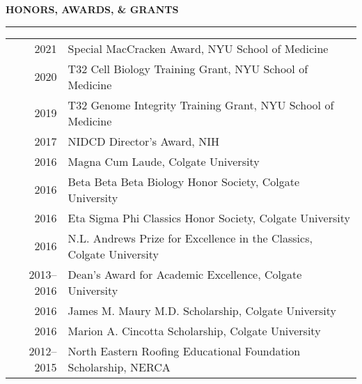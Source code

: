 \documentclass[10pt, letterpaper]{article} %
\newenvironment{CVSection}{
\begin{addmargin}[2em]{0em}
\begin{samepage}}
{\end{samepage}
\end{addmargin}\bigskip}
\newcommand{\CVHeading}[1]{
\MakeUppercase{\bf #1}
\smallskip
\hrule
\medskip
}
\begin{document}
\CVHeading{Honors, Awards, \& Grants}
\begin{CVSection}
\begin{tabular}{r|l}
2021 & Special MacCracken Award, NYU School of Medicine\\
2020 & T32 Cell Biology Training Grant, NYU School of Medicine\\
2019 & T32 Genome Integrity Training Grant, NYU School of Medicine\\
2017 & NIDCD Director’s Award, NIH\\
2016 & Magna Cum Laude, Colgate University\\
2016 & Beta Beta Beta Biology Honor Society, Colgate University\\
2016 & Eta Sigma Phi Classics Honor Society, Colgate University\\
2016 & N.L. Andrews Prize for Excellence in the Classics, Colgate University\\
2013--2016 & Dean’s Award for Academic Excellence, Colgate University\\
2016 & James M. Maury M.D. Scholarship, Colgate University\\
2016 & Marion A. Cincotta Scholarship, Colgate University\\
2012--2015 & North Eastern Roofing Educational Foundation Scholarship, NERCA\\
\end{tabular}
\end{CVSection}
\end{document}
